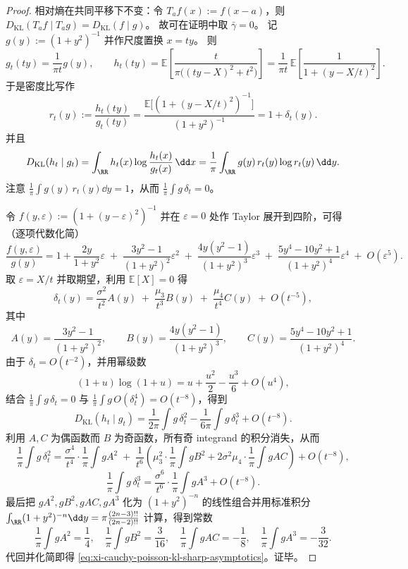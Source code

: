 \begin{proof}
相对熵在共同平移下不变：令 \(T_a f(x):=f(x-a)\)，则 \(D_{\mathrm{KL}}(T_a f\mid T_a g)=D_{\mathrm{KL}}(f\mid g)\)。
故可在证明中取 \(\bar\gamma=0\)。
记 \(g(y):=(1+y^2)^{-1}\) 并作尺度置换 \(x=ty\)。
则
\[
g_t(ty)=\frac{1}{\pi t}g(y),
\qquad
h_t(ty)=\mathbb{E}\!\left[\frac{t}{\pi\bigl((ty-X)^2+t^2\bigr)}\right]
=\frac{1}{\pi t}\,\mathbb{E}\!\left[\frac{1}{1+(y-X/t)^2}\right].
\]
于是密度比写作
\[
r_t(y):=\frac{h_t(ty)}{g_t(ty)}
=\frac{\mathbb{E}\bigl[(1+(y-X/t)^2)^{-1}\bigr]}{(1+y^2)^{-1}}
=1+\delta_t(y).
\]
并且
\[
D_{\mathrm{KL}}(h_t\mid g_t)
=\int_{\RR}h_t(x)\log\frac{h_t(x)}{g_t(x)}\,\dd x
=\frac{1}{\pi}\int_{\RR} g(y)\,r_t(y)\log r_t(y)\,\dd y.
\]
注意 \(\frac{1}{\pi}\int g(y)\,r_t(y)\dd y=1\)，从而 \(\frac{1}{\pi}\int g\,\delta_t=0\)。
\par
令 \(f(y,\varepsilon):=(1+(y-\varepsilon)^2)^{-1}\) 并在 \(\varepsilon=0\) 处作 Taylor 展开到四阶，可得（逐项代数化简）
\[
\frac{f(y,\varepsilon)}{g(y)}
=1+\frac{2y}{1+y^2}\varepsilon
\;+\;\frac{3y^2-1}{(1+y^2)^2}\varepsilon^2
\;+\;\frac{4y(y^2-1)}{(1+y^2)^3}\varepsilon^3
\;+\;\frac{5y^4-10y^2+1}{(1+y^2)^4}\varepsilon^4
\;+\;O(\varepsilon^5).
\]
取 \(\varepsilon=X/t\) 并取期望，利用 \(\mathbb{E}[X]=0\) 得
\[
\delta_t(y)
=\frac{\sigma^2}{t^2}A(y)
\;+\;\frac{\mu_3}{t^3}B(y)
\;+\;\frac{\mu_4}{t^4}C(y)
\;+\;O(t^{-5}),
\]
其中
\[
A(y)=\frac{3y^2-1}{(1+y^2)^2},\qquad
B(y)=\frac{4y(y^2-1)}{(1+y^2)^3},\qquad
C(y)=\frac{5y^4-10y^2+1}{(1+y^2)^4}.
\]
由于 \(\delta_t=O(t^{-2})\)，并用幂级数
\[
(1+u)\log(1+u)=u+\frac{u^2}{2}-\frac{u^3}{6}+O(u^4),
\]
结合 \(\frac{1}{\pi}\int g\,\delta_t=0\) 与 \(\frac{1}{\pi}\int g\,O(\delta_t^4)=O(t^{-8})\)，得到
\[
D_{\mathrm{KL}}(h_t\mid g_t)
=\frac{1}{2\pi}\int g\,\delta_t^2
-\frac{1}{6\pi}\int g\,\delta_t^3
+O(t^{-8}).
\]
利用 \(A,C\) 为偶函数而 \(B\) 为奇函数，所有奇 integrand 的积分消失，从而
\[
\frac{1}{\pi}\int g\,\delta_t^2
=\frac{\sigma^4}{t^4}\cdot\frac{1}{\pi}\int gA^2
\;+\;\frac{1}{t^6}\left(
\mu_3^2\cdot\frac{1}{\pi}\int gB^2
+2\sigma^2\mu_4\cdot\frac{1}{\pi}\int gAC
\right)
+O(t^{-8}),
\]
\[
\frac{1}{\pi}\int g\,\delta_t^3
=\frac{\sigma^6}{t^6}\cdot\frac{1}{\pi}\int gA^3
+O(t^{-8}).
\]
最后把 \(gA^2,gB^2,gAC,gA^3\) 化为 \((1+y^2)^{-n}\) 的线性组合并用标准积分
\(
\int_{\RR}(1+y^2)^{-n}\dd y
=\pi\frac{(2n-3)!!}{(2n-2)!!}
\)
计算，得到常数
\[
\frac{1}{\pi}\int gA^2=\frac14,\quad
\frac{1}{\pi}\int gB^2=\frac{3}{16},\quad
\frac{1}{\pi}\int gAC=-\frac18,\quad
\frac{1}{\pi}\int gA^3=-\frac{3}{32}.
\]
代回并化简即得 \eqref{eq:xi-cauchy-poisson-kl-sharp-asymptotics}。证毕。
\end{proof}

